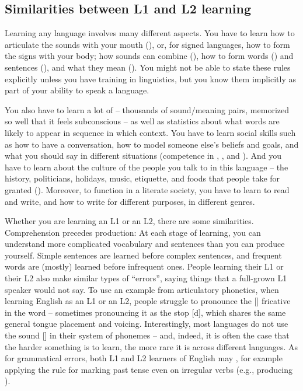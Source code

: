 \subsection{Similarities between L1 and L2 learning}

Learning any language involves many different aspects. You have to
learn how to articulate the sounds with your mouth
(), or, for signed languages, how to
form the signs with your body; how sounds can combine
(), how to form words () and
sentences (), and what they mean
().  You might not be able to state these rules explicitly unless you have training in linguistics, but you know them implicitly as
part of your ability to speak a language.

You also have to learn a lot of  -- thousands of
sound/meaning pairs, memorized so well that it feels subconscious --
as well as statistics about what words are likely to appear in
sequence in which context.  You have to learn social skills such as
how to have a conversation, how to model someone else's beliefs and
goals, and what you should say in different situations (competence in
, , and ).
And you have to learn about the culture of the people you talk to in
this language -- the history, politicians, holidays, music, etiquette,
and foods that people take for granted ().  Moreover, to function in a literate society, you have
to learn to read and write, and how to write for different purposes, in
different genres.

Whether you are learning an L1 or an L2, there are some similarities.
Comprehension precedes production: At each stage of learning, you can
understand more complicated vocabulary and sentences than you can
produce yourself.  Simple sentences are learned before complex
sentences, and frequent words are (mostly) learned before infrequent
ones.  People learning their L1 or their L2 also make similar types of
``errors'', saying things that a full-grown L1 speaker would not say.
To use an example from articulatory phonetics, when learning English
as an L1 or an L2, people struggle to pronounce the [\dh] fricative in
the word  -- sometimes pronouncing it as the
stop [d], which shares the same general tongue placement and
voicing. Interestingly, most languages do not use the sound [\dh] in
their system of phonemes -- and, indeed, it is often the case that the
harder something is to learn, the more rare it is across different languages.  As
for grammatical errors, both L1 and L2 learners of English may
, for example applying the rule for marking
past tense even on irregular verbs (e.g., producing ).

